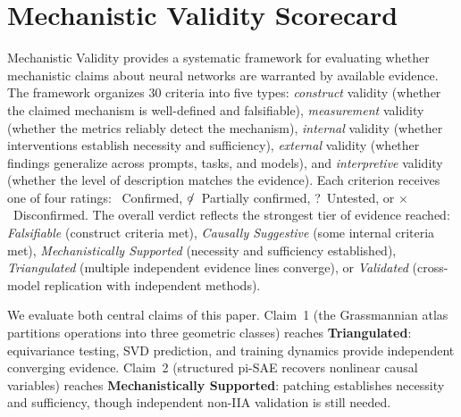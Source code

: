 %


\providecommand{\cmark}{{\color{confirmed}\checkmark}}%
\providecommand{\pmark}{{\color{partial}$\circ\mkern-7mu/$}}%
\providecommand{\umark}{{\color{untested}?}}%
\providecommand{\xmark}{{\color{red}$\times$}}%

\section{Mechanistic Validity Scorecard}
\label{app:mechval}

Mechanistic Validity \citep{tower2026mechval} provides a systematic framework
for evaluating whether mechanistic claims about neural networks are warranted
by available evidence. The framework organizes 30 criteria into five types:
\emph{construct} validity (whether the claimed mechanism is well-defined and
falsifiable), \emph{measurement} validity (whether the metrics reliably detect
the mechanism), \emph{internal} validity (whether interventions establish
necessity and sufficiency), \emph{external} validity (whether findings
generalize across prompts, tasks, and models), and \emph{interpretive} validity
(whether the level of description matches the evidence). Each criterion
receives one of four ratings: \cmark~Confirmed, \pmark~Partially confirmed,
\umark~Untested, or \xmark~Disconfirmed. The overall verdict reflects the
strongest tier of evidence reached: \emph{Falsifiable} (construct criteria
met), \emph{Causally Suggestive} (some internal criteria met),
\emph{Mechanistically Supported} (necessity and sufficiency established),
\emph{Triangulated} (multiple independent evidence lines converge), or
\emph{Validated} (cross-model replication with independent methods).

We evaluate both central claims of this paper. Claim~1 (the Grassmannian atlas
partitions operations into three geometric classes) reaches \textbf{Triangulated}:
equivariance testing, SVD prediction, and training dynamics provide independent
converging evidence. Claim~2 (structured pi-SAE recovers nonlinear causal
variables) reaches \textbf{Mechanistically Supported}: patching establishes
necessity and sufficiency, though independent non-IIA validation is still needed.

